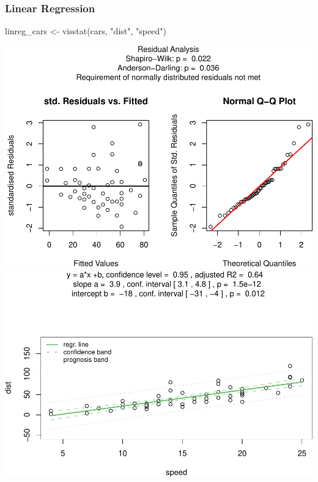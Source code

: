 \documentclass[
]{article}
\newenvironment{Shaded}{\begin{snugshade}}{\end{snugshade}}
\newcommand{\FunctionTok}[1]{\textcolor[rgb]{0.00,0.00,0.00}{#1}}
\newcommand{\NormalTok}[1]{#1}
\newcommand{\OtherTok}[1]{\textcolor[rgb]{0.56,0.35,0.01}{#1}}
\newcommand{\StringTok}[1]{\textcolor[rgb]{0.31,0.60,0.02}{#1}}
\begin{document}
\hypertarget{linear-regression}{%
\subsubsection{Linear Regression}\label{linear-regression}}

\begin{Shaded}
\begin{Highlighting}[]
\NormalTok{linreg\_cars }\OtherTok{\textless{}{-}} \FunctionTok{visstat}\NormalTok{(cars, }\StringTok{"dist"}\NormalTok{, }\StringTok{"speed"}\NormalTok{)}
\end{Highlighting}
\end{Shaded}

\includegraphics[width=1\linewidth]{man/figures/README-unnamed-chunk-9-1}
\includegraphics[width=1\linewidth]{man/figures/README-unnamed-chunk-9-2}
\end{document}
